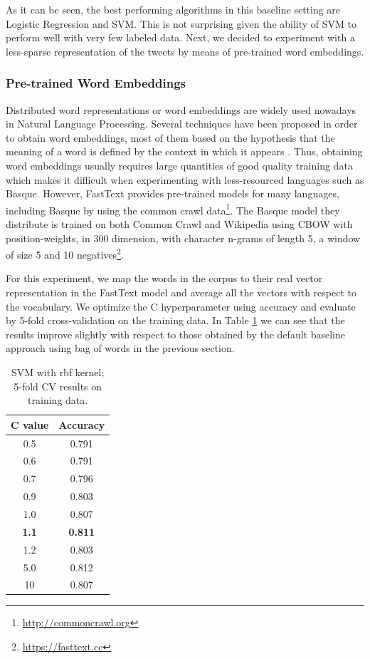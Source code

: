 \documentclass[information,article,submit,moreauthors,pdftex,10pt,a4paper]{Definitions/mdpi}
\begin{document}
As it can be seen, the best performing algorithms in this baseline setting are Logistic Regression and SVM. This is not surprising given the ability of SVM to perform well with very few labeled data. Next, we decided to experiment with a less-sparse representation of the tweets by means of pre-trained word embeddings.

\subsubsection{Pre-trained Word Embeddings}\label{sec:pre-trained-word}

Distributed word representations or word embeddings are widely used nowadays in Natural Language Processing. Several techniques have been proposed in order to obtain word embeddings, most of them based on the hypothesis that the meaning of a word is defined by the context in which it appears \cite{mikolov2013distributed,pennington-etal-2014-glove}. Thus, obtaining word embeddings usually requires large quantities of good quality training data which makes it difficult when experimenting with less-resourced languages such as Basque. However, FastText provides pre-trained models for many languages, including Basque \cite{mikolov-etal-2018-advances} by using the common crawl data\footnote{\url{http://commoncrawl.org}}. The Basque model they distribute is trained on both Common Crawl and Wikipedia using CBOW with position-weights, in 300 dimension, with character n-grams of length 5, a window of size 5 and 10 negatives\footnote{\url{https://fasttext.cc}}.

For this experiment, we map the words in the corpus to their real vector representation in the FastText model and average all the vectors with respect to the vocabulary. We optimize the C hyperparameter using accuracy and evaluate by 5-fold cross-validation on the training data. In Table \ref{tab:svm-embeddings} we can see that the results improve slightly with respect to those obtained by the default baseline approach using bag of words in the previous section.

\begin{table}[H]
  \centering
  \begin{tabular}{|c|c|}
    \hline
    \textbf{C value} & \textbf{Accuracy} \\ \hline \hline
    0.5 & 0.791 \\
    0.6 & 0.791 \\
    0.7 & 0.796 \\
    0.9 & 0.803 \\
    1.0 & 0.807 \\
    \textbf{1.1} & \textbf{0.811} \\
    1.2 & 0.803 \\
    5.0 & 0.812 \\
    10 & 0.807 \\ \hline
  \end{tabular}
  \caption{SVM with rbf kernel; 5-fold CV results on training data.}
  \label{tab:svm-embeddings}
\end{table}
\end{document}
